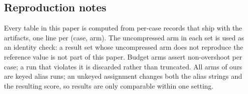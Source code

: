 \subsection{Reproduction notes}

Every table in this paper is computed from per-case records that ship with the artifacts, one
line per (case, arm). The uncompressed arm in each set is used as an identity check: a result
set whose uncompressed arm does not reproduce the reference value is not part of this paper.
Budget arms assert non-overshoot per case; a run that violates it is discarded rather than
truncated. All arms of ours are keyed alias runs; an unkeyed assignment changes both the
alias strings and the resulting score, so results are only comparable within one setting.


